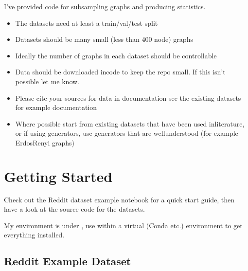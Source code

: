 \documentclass[letterpaper,10pt,english]{sphinxhowto}
\begin{document}
\sphinxAtStartPar
I’ve provided code for sub\sphinxhyphen{}sampling graphs and producing statistics.
\begin{description}
\begin{itemize}
\item {} 
\sphinxAtStartPar
The datasets need at least a train/val/test split

\item {} 
\sphinxAtStartPar
Datasets should be many small (less than 400 node) graphs

\item {} 
\sphinxAtStartPar
Ideally the number of graphs in each dataset should be controllable

\item {} 
\sphinxAtStartPar
Data should be downloaded in\sphinxhyphen{}code to keep the repo small. If this isn’t possible let me know.

\item {} 
\sphinxAtStartPar
Please cite your sources for data in documentation \sphinxhyphen{} see the existing datasets for example documentation

\item {} 
\sphinxAtStartPar
Where possible start from existing datasets that have been used in\sphinxhyphen{}literature, or if using generators, use generators that are well\sphinxhyphen{}understood (for example Erdos\sphinxhyphen{}Renyi graphs)

\end{itemize}

\end{description}


\section{Getting Started}
\label{\detokenize{index:getting-started}}
\sphinxAtStartPar
Check out the Reddit dataset example notebook for a quick start guide, then have a look at the source code for the datasets.

\sphinxAtStartPar
My environment is under , use  within a virtual (Conda etc.) environment to get everything installed.

\sphinxstepscope


\subsection{Reddit Example Dataset}
\label{\detokenize{reddit-dataset-example:Reddit-Example-Dataset}}\label{\detokenize{reddit-dataset-example::doc}}
\end{document}
